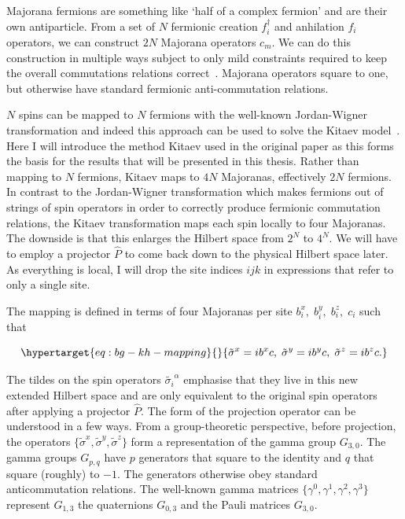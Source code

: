 Majorana fermions are something like `half of a complex fermion' and are their own antiparticle. From a set of \(N\) fermionic creation \(f_i^\dagger\) and anhilation \(f_i\) operators, we can construct \(2N\) Majorana operators \(c_m\). We can do this construction in multiple ways subject to only mild constraints required to keep the overall commutations relations correct~\autocite{kitaevAnyonsExactlySolved2006}. Majorana operators square to one, but otherwise have standard fermionic anti-commutation relations.

\(N\) spins can be mapped to \(N\) fermions with the well-known Jordan-Wigner transformation and indeed this approach can be used to solve the Kitaev model~\autocite{chenExactResultsKitaev2008}. Here I will introduce the method Kitaev used in the original paper as this forms the basis for the results that will be presented in this thesis. Rather than mapping to \(N\) fermions, Kitaev maps to \(4N\) Majoranas, effectively \(2N\) fermions. In contrast to the Jordan-Wigner transformation which makes fermions out of strings of spin operators in order to correctly produce fermionic commutation relations, the Kitaev transformation maps each spin locally to four Majoranas. The downside is that this enlarges the Hilbert space from \(2^N\) to \(4^N\). We will have to employ a projector \(\hat{P}\) to come back down to the physical Hilbert space later. As everything is local, I will drop the site indices \(ijk\) in expressions that refer to only a single site.

The mapping is defined in terms of four Majoranas per site \(b_i^x,\;b_i^y,\;b_i^z,\;c_i\) such that

\begin{equation}\protect\hypertarget{eq:bg-kh-mapping}{}{\tilde{\sigma}^x = i b^x c,\; \tilde{\sigma}^y = i b^y c,\; \tilde{\sigma}^z = i b^z c.}\label{eq:bg-kh-mapping}\end{equation}

The tildes on the spin operators \(\tilde{\sigma_i}^\alpha\) emphasise that they live in this new extended Hilbert space and are only equivalent to the original spin operators after applying a projector \(\hat{P}\). The form of the projection operator can be understood in a few ways. From a group-theoretic perspective, before projection, the operators \(\{\tilde{\sigma}^x, \tilde{\sigma}^y, \tilde{\sigma}^z\}\) form a representation of the gamma group \(G_{3,0}\). The gamma groups \(G_{p,q}\) have \(p\) generators that square to the identity and \(q\) that square (roughly) to \(-1\). The generators otherwise obey standard anticommutation relations. The well-known gamma matrices \(\{\gamma^0, \gamma^1, \gamma^2, \gamma^3\}\) represent \(G_{1,3}\) the quaternions \(G_{0,3}\) and the Pauli matrices \(G_{3,0}\).

